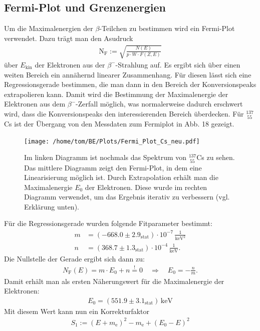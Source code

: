 \documentclass[german,  %
parskip=full,  %
]{scrartcl}
\begin{document}
\subsection{Fermi-Plot und Grenzenergien}
Um die Maximalenergien der $\beta$-Teilchen zu bestimmen wird ein Fermi-Plot verwendet. Dazu trägt man den Asudruck
\begin{align*}
\text{N}_{\text{F}} := \sqrt{\frac{N(E)}{p\cdot W\cdot F(Z,E)}}
\end{align*}
über \(E_{\mathrm{kin}}\) der Elektronen aus der \(\beta^-\)-Strahlung auf. Es ergibt sich über einen weiten Bereich ein annähernd linearer Zusammenhang. Für diesen lässt sich eine Regressionsgerade bestimmen, die man dann in den Bereich der Konversionspeaks extrapolieren kann. Damit wird die Bestimmung der Maximalenergie der Elektronen aus dem \(\beta^-\)-Zerfall möglich, was normalerweise dadurch erschwert wird, dass die Konversionspeaks den interessierenden Bereich überdecken. Für $^{137}_{\ 55}$Cs ist der Übergang von den Messdaten zum Fermiplot in Abb. 18 gezeigt.
\newpage
\begin{figure}[h!]\centering
\texttt{[image: /home/tom/BE/Plots/Fermi\_Plot\_Cs\_neu.pdf]}
\caption{Im linken Diagramm ist nochmals das Spektrum von $^{137}_{\ 55}$Cs zu sehen. Das mittlere Diagramm zeigt den Fermi-Plot, in dem eine Linearisierung möglich ist. Durch Extrapolation erhält man die Maximalenergie \(E_0\) der Elektronen. Diese wurde im rechten Diagramm verwendet, um das Ergebnis iterativ zu verbessern (vgl. Erklärung unten).} 
\end{figure}
Für die Regressionsgerade wurden folgende Fitparameter bestimmt:
\begin{align*}
m &= (-668.0\pm 2.9_{\mathrm{stat}})\cdot 10^{-7}\,\frac{1}{\mathrm{keV^2}} \\
n &= (368.7\pm 1.3_{\mathrm{stat}})\cdot 10^{-4}\,\frac{1}{\mathrm{keV}}.
\end{align*}
Die Nullstelle der Gerade ergibt sich dann zu:
\begin{align*}
N_{\mathrm{F}}(E) = m\cdot E_0 + n \overset{!}{=} 0\quad\Longrightarrow\quad E_0 = -\frac{n}{m}.
\end{align*}
Damit erhält man als ersten Näherungswert für die Maximalenergie der Elektronen:
\begin{align*}
E_0 = (551.9\pm 3.1_{\mathrm{stat}})\,\mathrm{keV}
\end{align*}
Mit diesem Wert kann nun ein Korrekturfaktor
\begin{align*}
S_1 := (E+m_{\mathrm{e}})^2 - m_{\mathrm{e}} + (E_0-E)^2
\end{align*}
\end{document}
